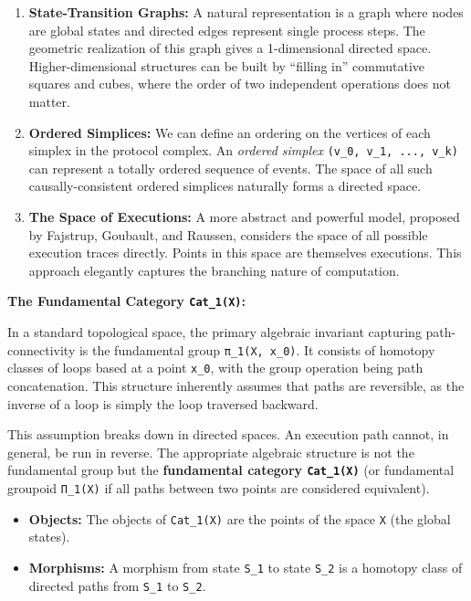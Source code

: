 \documentclass[
]{article}
\providecommand{\tightlist}{%
  \setlength{\itemsep}{0pt}\setlength{\parskip}{0pt}}
\begin{document}
\begin{enumerate}
\def\labelenumi{\arabic{enumi}.}
\item
  \textbf{State-Transition Graphs:} A natural representation is a graph
  where nodes are global states and directed edges represent single
  process steps. The geometric realization of this graph gives a
  1-dimensional directed space. Higher-dimensional structures can be
  built by ``filling in'' commutative squares and cubes, where the order
  of two independent operations does not matter.
\item
  \textbf{Ordered Simplices:} We can define an ordering on the vertices
  of each simplex in the protocol complex. An \emph{ordered simplex}
  \texttt{(v\_0,\ v\_1,\ ...,\ v\_k)} can represent a totally ordered
  sequence of events. The space of all such causally-consistent ordered
  simplices naturally forms a directed space.
\item
  \textbf{The Space of Executions:} A more abstract and powerful model,
  proposed by Fajstrup, Goubault, and Raussen, considers the space of
  all possible execution traces directly. Points in this space are
  themselves executions. This approach elegantly captures the branching
  nature of computation.
\end{enumerate}

\textbf{The Fundamental Category \texttt{Cat\_1(X)}:}

In a standard topological space, the primary algebraic invariant
capturing path-connectivity is the fundamental group
\texttt{π\_1(X,\ x\_0)}. It consists of homotopy classes of loops based
at a point \texttt{x\_0}, with the group operation being path
concatenation. This structure inherently assumes that paths are
reversible, as the inverse of a loop is simply the loop traversed
backward.

This assumption breaks down in directed spaces. An execution path
cannot, in general, be run in reverse. The appropriate algebraic
structure is not the fundamental group but the \textbf{fundamental
category \texttt{Cat\_1(X)}} (or fundamental groupoid \texttt{Π\_1(X)}
if all paths between two points are considered equivalent).

\begin{itemize}
\tightlist
\item
  \textbf{Objects:} The objects of \texttt{Cat\_1(X)} are the points of
  the space \texttt{X} (the global states).
\item
  \textbf{Morphisms:} A morphism from state \texttt{S\_1} to state
  \texttt{S\_2} is a homotopy class of directed paths from \texttt{S\_1}
  to \texttt{S\_2}.
\end{itemize}
\end{document}
